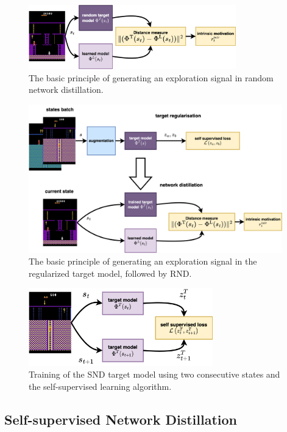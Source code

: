 \documentclass[a4paper,11pt]{elsarticle}
\begin{document}
\begin{figure}[thb]
  \centering
  \includegraphics[width=9cm]{fig/diagrams/cnd-rnd.png}
  \caption{The basic principle of generating an exploration signal in random network distillation.}
\label{fig:cnd_rnd}
\end{figure}

\begin{figure}[h]
\centering
  \includegraphics[width=11cm]{fig/diagrams/cnd-cnd.png}
  \caption{The basic principle of generating an exploration signal in the regularized target model, followed by RND.}
  \label{fig:cnd_cnd}
\end{figure}

\begin{figure}[thb]
\centering
\includegraphics[width=8cm]{fig/diagrams/cnd-std.png}
\caption{Training of the SND target model using two consecutive states and the self-supervised learning algorithm.}
\label{fig:std_dim_idea}
\end{figure}


\subsection{Self-supervised Network Distillation}
\end{document}

